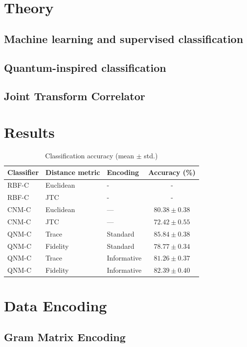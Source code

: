 \documentclass[twocolumn]{article} %
\begin{document}
\section{Theory}

\subsection{Machine learning and supervised classification}
\subsection{Quantum-inspired classification}
\subsection{Joint Transform Correlator}

\section{Results}

\begin{table}[htbp]
  \centering
  \caption{Classification accuracy (mean $\pm$ std.)}
  \label{tab:cls-results}
  \begin{tabular}{@{}lll c@{}}
    \toprule
    Classifier & Distance metric & Encoding & Accuracy (\%)\\ 
    \midrule
    RBF-C & Euclidean & - & - \\
    RBF-C & JTC & - & - \\[2pt]
    CNM-C & Euclidean & — & $80.38 \pm 0.38$ \\ 
    CNM-C & JTC & — & $72.42 \pm 0.55$ \\[2pt]
    QNM-C & Trace     & Standard     & \textbf{$85.84 \pm 0.38$} \\ 
    QNM-C & Fidelity  & Standard     & $78.77 \pm 0.34$ \\[2pt]
    QNM-C & Trace     & Informative  & $81.26 \pm 0.37$ \\ 
    QNM-C & Fidelity  & Informative  & \textbf{$82.39 \pm 0.40$} \\ 
    \bottomrule
  \end{tabular}
\end{table}




\section{Data Encoding}
\subsection{Gram Matrix Encoding}
\end{document}
